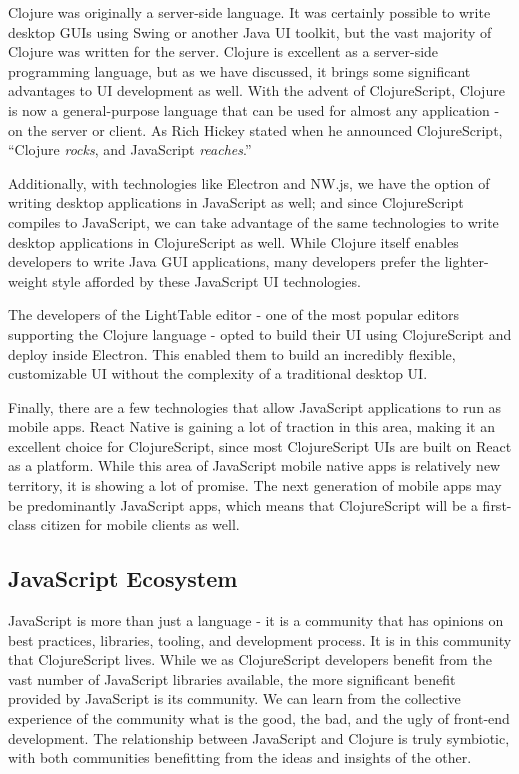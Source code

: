 \documentclass[10pt,twoside,openright]{memoir}
\begin{document}
Clojure was originally a server-side language. It was certainly possible
to write desktop GUIs using Swing or another Java UI toolkit, but the
vast majority of Clojure was written for the server. Clojure is
excellent as a server-side programming language, but as we have
discussed, it brings some significant advantages to UI development as
well. With the advent of ClojureScript, Clojure is now a general-purpose
language that can be used for almost any application - on the server or
client. As Rich Hickey stated when he announced ClojureScript, ``Clojure
\emph{rocks}, and JavaScript \emph{reaches}.''

Additionally, with technologies like Electron and NW.js, we have the
option of writing desktop applications in JavaScript as well; and since
ClojureScript compiles to JavaScript, we can take advantage of the same
technologies to write desktop applications in ClojureScript as well.
While Clojure itself enables developers to write Java GUI applications,
many developers prefer the lighter- weight style afforded by these
JavaScript UI technologies.

\begin{notice}[title={ClojureScript on the Desktop}]
The developers of the LightTable editor - one of the most popular
editors supporting the Clojure language - opted to build their UI using
ClojureScript and deploy inside Electron. This enabled them to build an
incredibly flexible, customizable UI without the complexity of a
traditional desktop UI.
\end{notice}

Finally, there are a few technologies that allow JavaScript applications
to run as mobile apps. React Native is gaining a lot of traction in this
area, making it an excellent choice for ClojureScript, since most
ClojureScript UIs are built on React as a platform. While this area of
JavaScript mobile native apps is relatively new territory, it is showing
a lot of promise. The next generation of mobile apps may be
predominantly JavaScript apps, which means that ClojureScript will be a
first-class citizen for mobile clients as well.

\subsection{JavaScript Ecosystem}

JavaScript is more than just a language - it is a community that has
opinions on best practices, libraries, tooling, and development process.
It is in this community that ClojureScript lives. While we as
ClojureScript developers benefit from the vast number of JavaScript
libraries available, the more significant benefit provided by JavaScript
is its community. We can learn from the collective experience of the
community what is the good, the bad, and the ugly of front-end
development. The relationship between JavaScript and Clojure is truly
symbiotic, with both communities benefitting from the ideas and insights
of the other.
\end{document}
